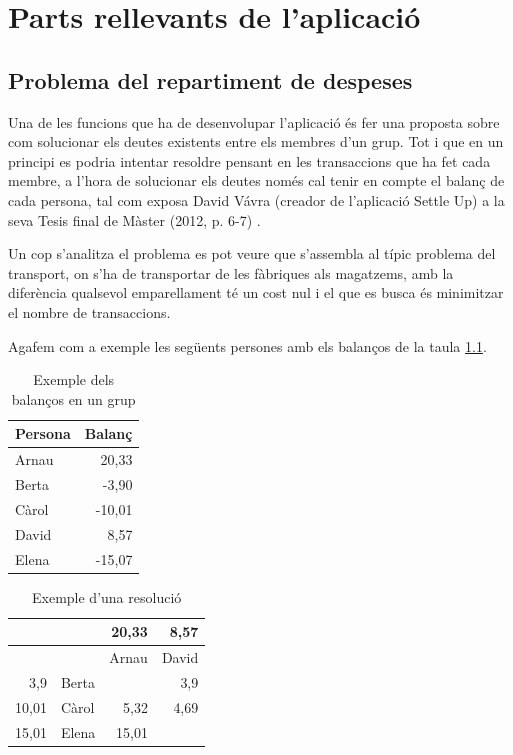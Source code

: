 \chapter{Parts rellevants de l'aplicació}

\section{Problema del repartiment de despeses}
Una de les funcions que ha de desenvolupar l'aplicació és fer una proposta sobre com solucionar els deutes existents entre els membres d'un grup. Tot i que en un principi es podria intentar resoldre pensant en les transaccions que ha fet cada membre, a l'hora de solucionar els deutes només cal tenir en compte el balanç de cada persona, tal com exposa David Vávra (creador de l'aplicació Settle Up) a la seva Tesis final de Màster (2012, p. 6-7) \cite{Settle_up}.

Un cop s'analitza el problema es pot veure que s'assembla al típic problema del transport, on s'ha de transportar de les fàbriques als magatzems, amb la diferència qualsevol emparellament té un cost nul i el que es busca és minimitzar el nombre de transaccions. 

Agafem com a exemple les següents persones amb els balanços de la taula \ref{table:balances}.

\begin{table}
\caption{Exemple dels balanços en un grup}
\label{table:balances}
\begin{tabular}{ | l | r |}
\hline
Persona & Balanç \\
\hline
Arnau & 20,33 \\
\hline
Berta & -3,90 \\
\hline
Càrol & -10,01 \\
\hline
David & 8,57 \\
\hline
Elena & -15,07 \\
\hline
\end{tabular}
\end{table}


\begin{table}
\caption{Exemple d'una resolució}
\label{table:resolution}
\begin{tabular}{ | r | l | r | r |}
 \hline
 & & 20,33 & 8,57 \\
 \hline
 & & Arnau & David \\
 \hline
 3,9 & Berta & & 3,9\\
 \hline
 10,01 & Càrol & 5,32 & 4,69\\
 \hline
 15,01 & Elena & 15,01 & \\
 \hline
\end{tabular}
\end{table}


